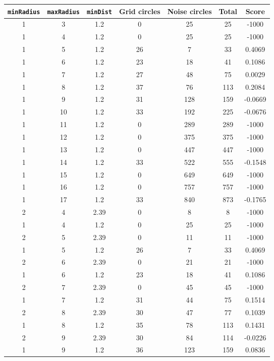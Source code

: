 \documentclass[letterpaper, 12pt]{article}
\begin{document}
\begin{longtable}{|c|c|c|c|c|c|c|}
\hline
\textbf{\texttt{minRadius}} & \textbf{\texttt{maxRadius}} & \textbf{\texttt{minDist}} & \textbf{Grid circles} & \textbf{Noise circles} & \textbf{Total} & \textbf{Score} \\
\hline
1 & 3 & 1.2 & 0 & 25 & 25 & -1000 \\
\hline
1 & 4 & 1.2 & 0 & 25 & 25 & -1000 \\
\hline
1 & 5 & 1.2 & 26 & 7 & 33 & 0.4069 \\
\hline
1 & 6 & 1.2 & 23 & 18 & 41 & 0.1086 \\
\hline
1 & 7 & 1.2 & 27 & 48 & 75 & 0.0029 \\
\hline
1 & 8 & 1.2 & 37 & 76 & 113 & 0.2084 \\
\hline
1 & 9 & 1.2 & 31 & 128 & 159 & -0.0669 \\
\hline
1 & 10 & 1.2 & 33 & 192 & 225 & -0.0676 \\
\hline
1 & 11 & 1.2 & 0 & 289 & 289 & -1000 \\
\hline
1 & 12 & 1.2 & 0 & 375 & 375 & -1000 \\
\hline
1 & 13 & 1.2 & 0 & 447 & 447 & -1000 \\
\hline
1 & 14 & 1.2 & 33 & 522 & 555 & -0.1548 \\
\hline
1 & 15 & 1.2 & 0 & 649 & 649 & -1000 \\
\hline
1 & 16 & 1.2 & 0 & 757 & 757 & -1000 \\
\hline
1 & 17 & 1.2 & 33 & 840 & 873 & -0.1765 \\
\hline
2 & 4 & 2.39 & 0 & 8 & 8 & -1000 \\
\hline
1 & 4 & 1.2 & 0 & 25 & 25 & -1000 \\
\hline
2 & 5 & 2.39 & 0 & 11 & 11 & -1000 \\
\hline
1 & 5 & 1.2 & 26 & 7 & 33 & 0.4069 \\
\hline
2 & 6 & 2.39 & 0 & 21 & 21 & -1000 \\
\hline
1 & 6 & 1.2 & 23 & 18 & 41 & 0.1086 \\
\hline
2 & 7 & 2.39 & 0 & 45 & 45 & -1000 \\
\hline
1 & 7 & 1.2 & 31 & 44 & 75 & 0.1514 \\
\hline
2 & 8 & 2.39 & 30 & 47 & 77 & 0.1039 \\
\hline
1 & 8 & 1.2 & 35 & 78 & 113 & 0.1431 \\
\hline
2 & 9 & 2.39 & 30 & 84 & 114 & -0.0226 \\
\hline
1 & 9 & 1.2 & 36 & 123 & 159 & 0.0836 \\

\end{longtable}
\end{document}

